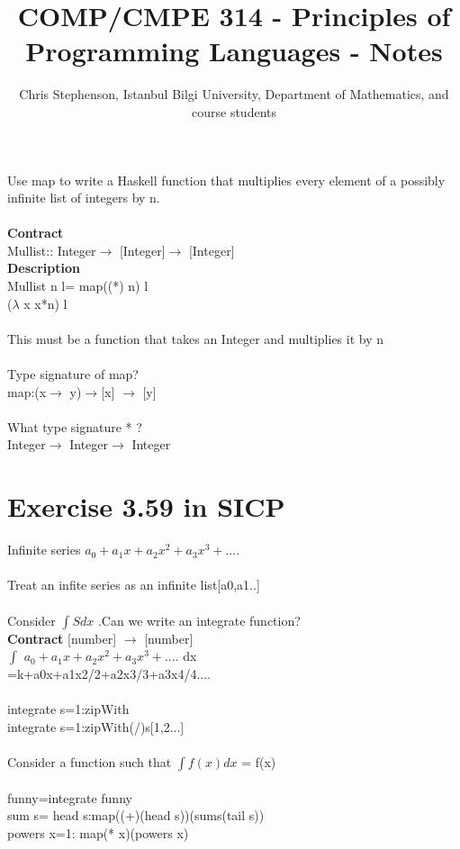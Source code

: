\documentclass{article}
\newcommand\tab[1][1cm]{\hspace*{#1}}
\begin{document}
\title{COMP/CMPE 314 - Principles of Programming Languages - Notes}
\author{Chris Stephenson, Istanbul Bilgi University, Department of Mathematics, and course students}
\maketitle
Use map to write a Haskell function that multiplies every element of a possibly infinite list of integers by n.\\ \\
\textbf{Contract}\\
Mullist:: Integer$\rightarrow$ [Integer]$\rightarrow$ [Integer]\\
\textbf{Description}\\
 Mullist n l= map((*) n) l\\
\tab[2.5cm] ($\lambda$ x x*n) l\\ \\
This must be a function that takes an Integer and multiplies it by n\\ \\
Type signature of map?\\
 map:(x$\rightarrow$ y)$\rightarrow$[x] $\rightarrow$ [y]\\ \\
What type signature * ?\\
Integer$\rightarrow$ Integer$\rightarrow$ Integer\\

\section{Exercise 3.59 in SICP}
Infinite series  $ {a}_{0} + {a}_{1}x + {a}_{2}{x}^{2} + {a}_{3}{x}^{3} +.... $ \\ \\
Treat an infite series as an infinite list[a0,a1..]\\ \\
Consider $\int S dx$ .Can we write an integrate function?\\
\textbf{Contract}
[number] $\rightarrow$ [number]\\
$\int$   $ {a}_{0} + {a}_{1}x + {a}_{2}{x}^{2} + {a}_{3}{x}^{3} +....$ dx \\
\tab=k+a0x+a1x2/2+a2x3/3+a3x4/4.... \\ \\
integrate s=1:zipWith\\
integrate s=1:zipWith(/)s[1,2...]\\ \\
Consider a function such that $\int f(x)dx$ = f(x)\\ \\
funny=integrate funny\\
sum s= head s:map((+)(head s))(sums(tail s))\\
powers x=1: map(* x)(powers x)\\
\end{document}
